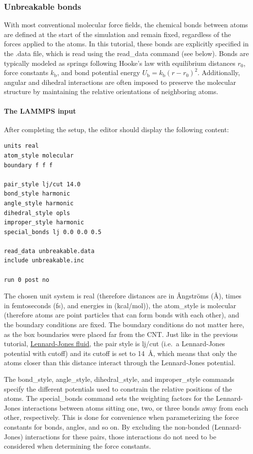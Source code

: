 \documentclass[9pt,tutorial]{livecoms}
\newcommand{\lmpcmd}[1]{\colorbox{listing}{\textcolor{command}{\small{#1}}}} %
\begin{document}
\subsubsection{Unbreakable bonds}

With most conventional molecular force fields, the chemical bonds
between atoms are defined at the start of the simulation and remain
fixed, regardless of the forces applied to the atoms.  In
this tutorial, these bonds are explicitly specified in the
\lmpcmd{.data} file, which is read using the \lmpcmd{read\_data}
command (see below).
Bonds are typically modeled as springs following Hooke's
law with equilibrium distances $r_0$, force constants $k_\text{b}$,
and bond potential energy
$U_\text{b} = k_\text{b} \left( r - r_0 \right)^2$.  Additionally,
angular and dihedral interactions are often imposed to
preserve the molecular structure by maintaining the relative
orientations of neighboring atoms.

\paragraph{The LAMMPS input}

After completing the setup, the editor should display the following content:
\begin{lstlisting}
units real
atom_style molecular
boundary f f f

pair_style lj/cut 14.0
bond_style harmonic
angle_style harmonic
dihedral_style opls
improper_style harmonic
special_bonds lj 0.0 0.0 0.5

read_data unbreakable.data
include unbreakable.inc

run 0 post no
\end{lstlisting}
The chosen unit system is \lmpcmd{real} (therefore distances are in
Ångströms (Å), times in femtoseconds (fs), and energies in (kcal/mol)), the
\lmpcmd{atom\_style} is \lmpcmd{molecular} (therefore atoms are point
particles that can form bonds with each other), and the boundary
conditions are fixed.  The boundary conditions do not matter here, as
the box boundaries were placed far from the CNT.  Just like in the
previous tutorial, \hyperref[lennard-jones-label]{Lennard-Jones fluid},
the pair style is \lmpcmd{lj/cut} (i.e.~a Lennard-Jones potential with
cutoff) and its cutoff is set to 14~Å, which means that only the
atoms closer than this distance interact through the Lennard-Jones
potential.

The \lmpcmd{bond\_style}, \lmpcmd{angle\_style},
\lmpcmd{dihedral\_style}, and \lmpcmd{improper\_style} commands specify
the different potentials used to constrain the relative positions of the
atoms.  The \lmpcmd{special\_bonds} command sets the weighting factors
for the Lennard-Jones interactions between atoms sitting one,
two, or three bonds away from each other, respectively.  This is done for
convenience when parameterizing the force constants for bonds, angles, and
so on.  By excluding the non-bonded (Lennard-Jones) interactions for
these pairs, those interactions do not need to be considered when determining
the force constants.
\end{document}
